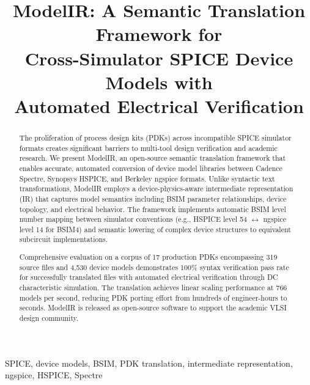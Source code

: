 \documentclass[conference]{IEEEtran}
\begin{document}
\title{ModelIR: A Semantic Translation Framework for \\Cross-Simulator SPICE Device Models with\\Automated Electrical Verification}

\author{
}

\maketitle

\begin{abstract}
The proliferation of process design kits (PDKs) across incompatible SPICE simulator formats creates significant barriers to multi-tool design verification and academic research. We present ModelIR, an open-source semantic translation framework that enables accurate, automated conversion of device model libraries between Cadence Spectre, Synopsys HSPICE, and Berkeley ngspice formats. Unlike syntactic text transformations, ModelIR employs a device-physics-aware intermediate representation (IR) that captures model semantics including BSIM parameter relationships, device topology, and electrical behavior. The framework implements automatic BSIM level number mapping between simulator conventions (e.g., HSPICE level 54 $\leftrightarrow$ ngspice level 14 for BSIM4) and semantic lowering of complex device structures to equivalent subcircuit implementations.

Comprehensive evaluation on a corpus of 17 production PDKs encompassing 319 source files and 4,530 device models demonstrates 100\% syntax verification pass rate for successfully translated files with automated electrical verification through DC characteristic simulation. The translation achieves linear scaling performance at 766 models per second, reducing PDK porting effort from hundreds of engineer-hours to seconds. ModelIR is released as open-source software to support the academic VLSI design community.
\end{abstract}

\begin{IEEEkeywords}
SPICE, device models, BSIM, PDK translation, intermediate representation, ngspice, HSPICE, Spectre
\end{IEEEkeywords}
\end{document}
